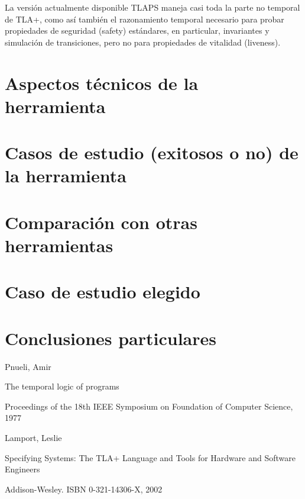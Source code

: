 \documentclass[spanish]{llncs}
\begin{document}
  La versión actualmente disponible TLAPS maneja casi toda la parte no temporal de TLA+, como así también el razonamiento temporal necesario para probar propiedades de 
  seguridad (safety) estándares, en particular, invariantes y simulación de transiciones, pero no para propiedades de vitalidad (liveness).


\section{Aspectos técnicos de la herramienta}
\section{Casos de estudio (exitosos o no) de la herramienta}
\section{Comparación con otras herramientas}
\section{Caso de estudio elegido}
\section{Conclusiones particulares}


%
%
\begin{thebibliography}{5}
%
Pnueli, Amir

The temporal logic of programs

Proceedings of the 18th IEEE Symposium on Foundation of Computer Science, 1977

Lamport, Leslie

Specifying Systems: The TLA+ Language and Tools for Hardware and Software Engineers

Addison-Wesley. ISBN 0-321-14306-X, 2002




\end{thebibliography}


\clearpage
{} %
\renewcommand{\indexname}{Author Index}
\printindex
\clearpage
{} %
\renewcommand{\indexname}{Subject Index}

\end{document}
